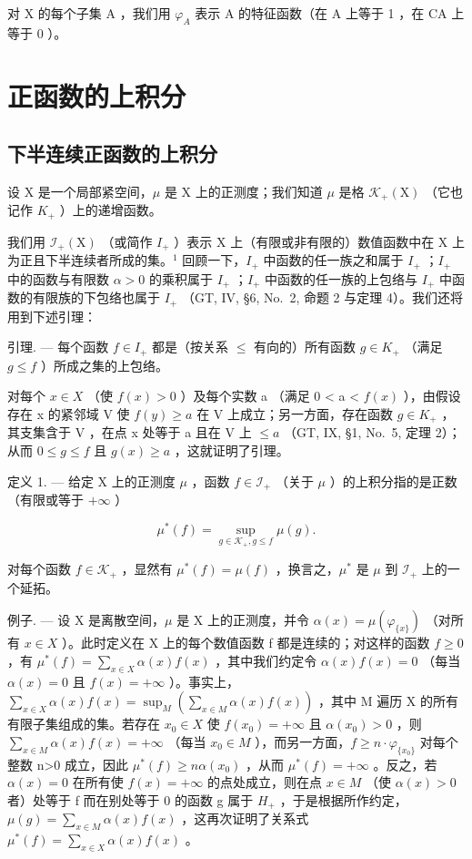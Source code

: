 对 X 的每个子集 A ，我们用 \(\varphi_{A}\) 表示 A 的特征函数（在 A 上等于 1 ，在 CA 上等于 0 ）。

\section{正函数的上积分}

\subsection{下半连续正函数的上积分}

设 X 是一个局部紧空间，\(\mu\) 是 X 上的正测度；我们知道 \(\mu\) 是格 \(\mathcal{K}_{+}(\mathrm{X})\) （它也记作 \(K_{+}\) ）上的递增函数。

我们用 \(\mathcal{I}_{+}(\mathrm{X})\) （或简作 \(I_{+}\) ）表示 X 上（有限或非有限的）数值函数中在 X 上为正且下半连续者所成的集。\(^{1}\) 回顾一下，\(I_{+}\) 中函数的任一族之和属于 \(I_{+}\) ；\(I_{+}\) 中的函数与有限数 \(\alpha > 0\) 的乘积属于 \(I_{+}\) ；\(I_{+}\) 中函数的任一族的上包络与 \(I_{+}\) 中函数的有限族的下包络也属于 \(I_{+}\) （GT, IV, §6, No.~2, 命题 2 与定理 4）。我们还将用到下述引理：

引理. --- 每个函数 \(f \in I_{+}\) 都是（按关系 \(\leqslant\) 有向的）所有函数 \(g \in K_{+}\) （满足 \(g \leqslant f\) ）所成之集的上包络。

对每个 \(x \in X\) （使 \(f(x) > 0\) ）及每个实数 a （满足 0 < a < \(f(x)\) ），由假设存在 x 的紧邻域 V 使 \(f(y) \geqslant a\) 在 V 上成立；另一方面，存在函数 \(g \in K_{+}\) ，其支集含于 V ，在点 x 处等于 a 且在 V 上 \(\leqslant a\) （GT, IX, §1, No.~5, 定理 2）；从而 \(0 \leqslant g \leqslant f\) 且 \(g(x) \geqslant a\) ，这就证明了引理。

定义 1. --- 给定 X 上的正测度 \(\mu\) ，函数 \(f \in \mathcal{I}_{+}\) （关于 \(\mu\) ）的上积分指的是正数（有限或等于 \(+\infty\) ）

\[
\mu^ {*} (f) = \sup _ {g \in \mathcal {K} _ {+}, g \leqslant f} \mu (g).
\]

对每个函数 \(f \in \mathcal{K}_+\) ，显然有 \(\mu^*(f) = \mu(f)\) ，换言之，\(\mu^*\) 是 \(\mu\) 到 \(\mathcal{I}_+\) 上的一个延拓。

例子. --- 设 X 是离散空间，\(\mu\) 是 X 上的正测度，并令 \(\alpha(x)=\mu(\varphi_{\{x\}})\) （对所有 \(x\in X\) ）。此时定义在 X 上的每个数值函数 f 都是连续的；对这样的函数 \(f\geqslant0\) ，有 \(\mu^{*}(f)=\sum_{x\in X}\alpha(x)f(x)\) ，其中我们约定令 \(\alpha(x)f(x)=0\) （每当 \(\alpha(x)=0\) 且 \(f(x)=+\infty\) ）。事实上，\(\sum_{x\in X}\alpha(x)f(x)=\sup_{M}\left(\sum_{x\in M}\alpha(x)f(x)\right)\) ，其中 M 遍历 X 的所有有限子集组成的集。若存在 \(x_{0}\in X\) 使 \(f(x_{0})=+\infty\) 且 \(\alpha(x_{0})>0\) ，则 \(\sum_{x\in M}\alpha(x)f(x)=+\infty\) （每当 \(x_{0}\in M\) ），而另一方面，\(f\geqslant n\cdot\varphi_{\{x_{0}\}}\) 对每个整数 n\textgreater0 成立，因此 \(\mu^{*}(f)\geqslant n\alpha(x_{0})\) ，从而 \(\mu^{*}(f)=+\infty\) 。反之，若 \(\alpha(x)=0\) 在所有使 \(f(x)=+\infty\) 的点处成立，则在点 \(x\in M\) （使 \(\alpha(x)>0\) 者）处等于 f 而在别处等于 0 的函数 g 属于 \(H_{+}\) ，于是根据所作约定，\(\mu(g)=\sum_{x\in M}\alpha(x)f(x)\) ，这再次证明了关系式 \(\mu^{*}(f)=\sum_{x\in X}\alpha(x)f(x)\) 。

